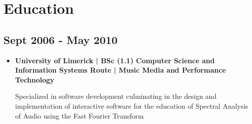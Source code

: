 \section{Education}

\subsection{Sept 2006 - May 2010}

\begin{itemize}
\item \textbf{University of Limerick | BSc (1.1) Computer Science and Information Systems
Route | Music Media and Performance Technology}

Specialized in software development culminating in the design and implementation of interactive software for the education of Spectral Analysis of Audio using the Fast Fourier Transform

\end{itemize}